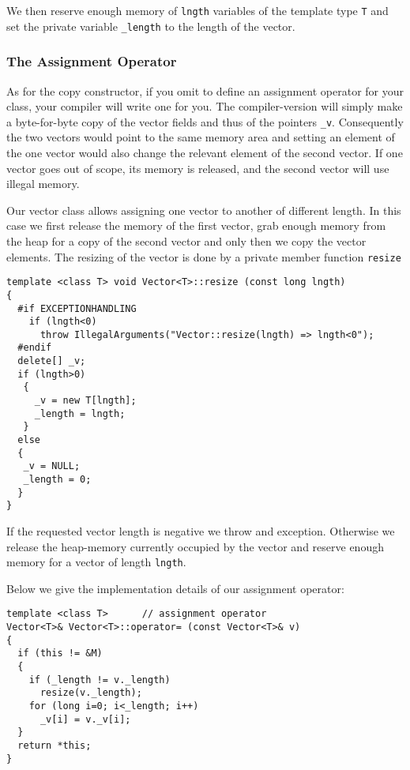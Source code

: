 We then reserve enough memory of \verb+lngth+ variables of the
template type \verb+T+ and set the private variable \verb+_length+
to the length of the vector.

\subsubsection{The Assignment Operator}

As for the copy constructor, if you omit to define an assignment
operator for your class, your compiler will write one for you.
The compiler-version will simply make a byte-for-byte copy
of the vector fields and thus of the pointers \verb+_v+. Consequently
the two vectors would point to the same memory area and setting
an element of the one vector would also change the relevant
element of the second vector. If one vector goes out of scope,
its memory is released, and the second vector will use illegal
memory. 

Our vector class allows assigning one vector to another of different
length. In this case we first release the memory of the first vector,
grab enough memory from the heap for a copy of the second vector
and only then we copy the vector elements. The resizing of the
vector is done by a private member function \verb+resize+
{\footnotesize \begin{verbatim}
template <class T> void Vector<T>::resize (const long lngth)
{
  #if EXCEPTIONHANDLING
    if (lngth<0)
      throw IllegalArguments("Vector::resize(lngth) => lngth<0");
  #endif
  delete[] _v;
  if (lngth>0)
   {
     _v = new T[lngth];
     _length = lngth;
   }
  else
  {
   _v = NULL;
   _length = 0;
  }
}
\end{verbatim}}
If the requested vector length is negative we throw and exception.
Otherwise we release the heap-memory currently occupied by the
vector and reserve enough memory for a vector of length \verb+lngth+.

Below we give the implementation details of our
assignment operator:

{\footnotesize \begin{verbatim}
template <class T>      // assignment operator
Vector<T>& Vector<T>::operator= (const Vector<T>& v)
{
  if (this != &M)
  {
    if (_length != v._length)
      resize(v._length);
    for (long i=0; i<_length; i++)
      _v[i] = v._v[i];
  }
  return *this;
}
\end{verbatim}}


